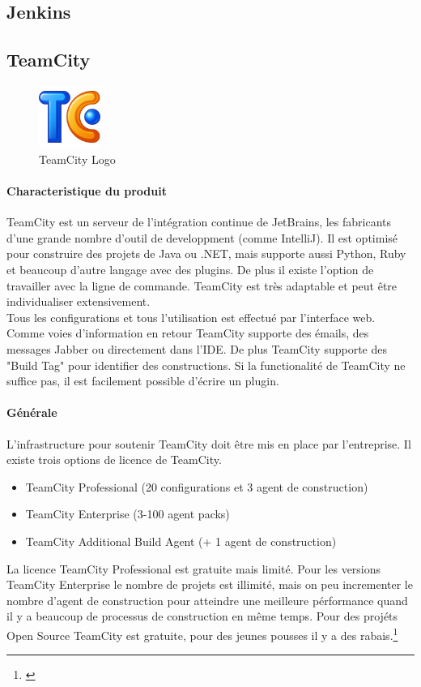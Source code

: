 \newpage

\subsection{Jenkins}
\clearpage
\subsection{TeamCity}
\begin{figure}
  \begin{center}
    \includegraphics[width=0.18\textwidth]{bilder/teamcity512}
  \end{center}
  \caption{TeamCity Logo}
\end{figure}
\paragraph{Characteristique du produit} TeamCity est un serveur de l'intégration continue de JetBrains, les fabricants d'une grande nombre d'outil de developpment (comme IntelliJ). Il est optimisé pour construire des projets de Java ou .NET, mais supporte aussi Python, Ruby et beaucoup d'autre langage avec des plugins. De plus il existe l'option de travailler avec la ligne de commande. TeamCity est très adaptable et peut être individualiser extensivement. \\
Tous les configurations et tous l'utilisation est effectué par l'interface web. Comme voies d'information en retour TeamCity supporte des émails, des messages Jabber ou directement dans l'IDE. De plus TeamCity supporte des "Build Tag" pour identifier des constructions. Si la functionalité de TeamCity ne suffice pas, il est facilement possible d'écrire un plugin.

\paragraph{Générale} L'infrastructure pour soutenir TeamCity doit être mis en place par l'entreprise. Il existe trois options de licence de TeamCity.
\begin{itemize}
	\item TeamCity Professional (20 configurations et 3 agent de construction)
	\item TeamCity Enterprise (3-100 agent packs)
	\item TeamCity Additional Build Agent (+ 1 agent de construction)
\end{itemize}
La licence TeamCity Professional est gratuite mais limité. Pour les versions TeamCity Enterprise le nombre de projets est illimité, mais on peu incrementer le nombre d'agent de construction pour atteindre une meilleure pérformance quand il y a beaucoup de processus de construction en même temps. Pour des projéts Open Source TeamCity est gratuite, pour des jeunes pousses il y a des rabais.\footnote{\citep{teamcitybuy}}

